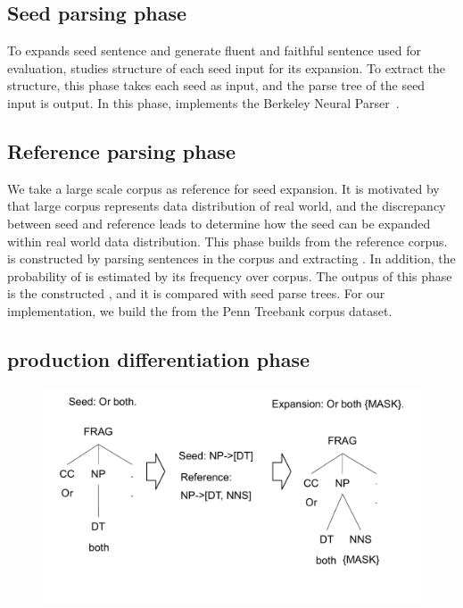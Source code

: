 \subsection{Seed parsing phase}
To expands seed sentence and generate fluent and faithful sentence
used for evaluation, \Model studies structure of each seed input for
its expansion. To extract the structure, this phase takes each seed as
input, and the parse tree of the seed input is output.  In this phase,
\Model implements the Berkeley Neural
Parser~\cite{kitaev2018seedparser,kitaev2019seedparser}.

\subsection{Reference parsing phase}
We take a large scale corpus as reference for seed expansion. It is
motivated by that large corpus represents data distribution of real
world, and the discrepancy between seed and reference leads to
determine how the seed can be expanded within real world data
distribution. This phase builds \pcfg from the reference corpus. \cfg
is constructed by parsing sentences in the corpus and extracting
\prodrs. In addition, the probability of \cfg is estimated by
its frequency over corpus. The outpus of this phase is the constructed
\pcfg, and it is compared with seed parse trees. For our
implementation, we build the \pcfg from the Penn Treebank corpus dataset.

\subsection{production differentiation phase}

\begin{figure}
  \centering
  \includegraphics[scale=0.33]{figs/expansion.pdf}
  \vspace{-20pt}
  \caption{\ExpansionExCaption}
  \vspace{-30pt}
\end{figure}

